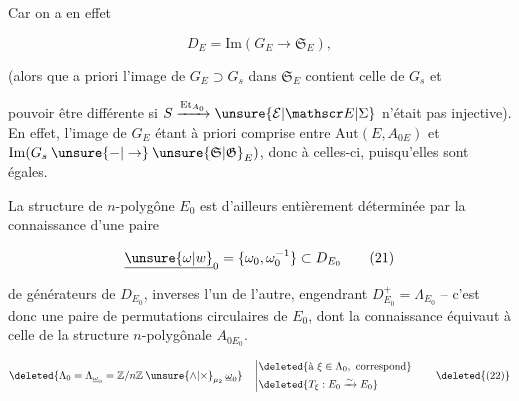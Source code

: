 Car on a en effet

\[
 D_E=\mathrm{Im}(G_E\longrightarrow\mathfrak S_E), \tag*{(20)}
\]

(alors que a priori l'image de $G_E\supset G_s$ dans
$\mathfrak S_E$ contient celle de $G_s$ et 


pouvoir être différente si $S\xrightarrow{\mathrm{Et}_{A_0}}\unsure{\mathcal E|\mathscr E|\Sigma}$ n'était pas injective). En effet, l'image de $G_E$ étant à priori comprise entre $\mathrm{Aut}(E,A_{0E})$ et $\mathrm{Im}(G_s\mathbin{\unsure{-|\to}}\unsure{\mathfrak S|\mathfrak G}_E)$, donc  à celles-ci, puisqu'elles sont égales.

La structure de $n$-polygône  $E_0$ est
d'ailleurs entièrement déterminée par la
connaissance d'une paire

\[
 \underline{\unsure{\omega|w}}_0=\{\omega_0,\omega_0^{-1}\}\subset D_{E_0} \tag*{(21)}
\]

de générateurs de $D_{E_0}$,  inverses l'un
de l'autre, engendrant $D_{E_0}^+=\Lambda_{E_0}$ -- c'est donc
une paire de permutations circulaires de
$E_0$, dont la connaissance équivaut à celle de
la structure $n$-polygônale $A_{0E_0}$.

\quad {} 

\[
 \deleted{\Lambda_0=\Lambda_{\underline\omega_0}=\mathbb Z/n\mathbb Z\mathbin{\unsure{\wedge|\times}}_{\mu_2}\underline\omega_0}\quad
 \left|\begin{aligned}
 &\deleted{\text{à }\xi\in\Lambda_0,\text{ correspond}}\\
 &\deleted{T_\xi:E_0\xrightarrow{\sim}E_0}
 \end{aligned}\right. \tag*{\deleted{(22)}}
\]

